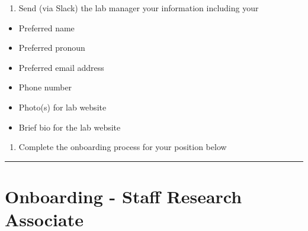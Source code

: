 \documentclass[]{book}
\providecommand{\tightlist}{%
  \setlength{\itemsep}{0pt}\setlength{\parskip}{0pt}}
\begin{document}
\begin{enumerate}
\def\labelenumi{\arabic{enumi}.}
\setcounter{enumi}{2}
\tightlist
\item
  Send (via Slack) the lab manager your information including your
\end{enumerate}

\begin{itemize}
\tightlist
\item
  Preferred name
\item
  Preferred pronoun
\item
  Preferred email address
\item
  Phone number
\item
  Photo(s) for lab website
\item
  Brief bio for the lab website
\end{itemize}

\begin{enumerate}
\def\labelenumi{\arabic{enumi}.}
\setcounter{enumi}{3}
\tightlist
\item
  Complete the onboarding process for your position below
\end{enumerate}

\begin{center}\rule{0.5\linewidth}{0.5pt}\end{center}

\section{Onboarding - Staff Research
Associate}\label{onboarding---staff-research-associate}
\end{document}
